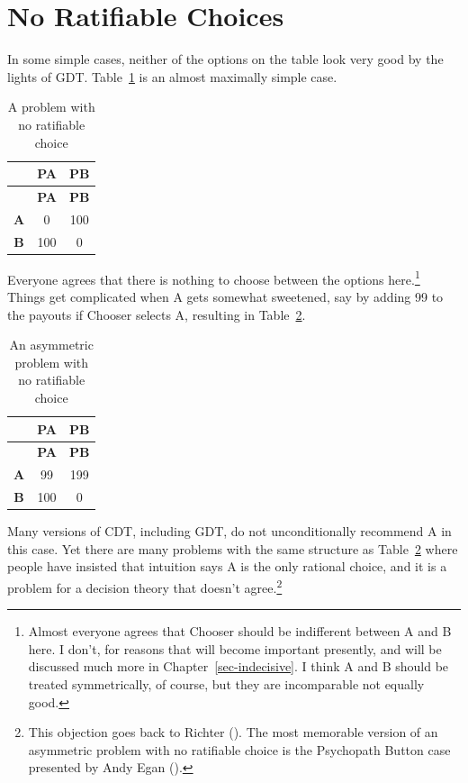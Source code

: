\documentclass[
  12pt,
  letterpaper,
  DIV=11,
  numbers=noendperiod]{scrreprt}
\begin{document}
\section{No Ratifiable Choices}\label{sec-no-ratify}

In some simple cases, neither of the options on the table look very good
by the lights of GDT. Table~\ref{tbl-no-ratify-1} is an almost maximally
simple case.

\begin{longtable}[]{@{}ccc@{}}
\caption{A problem with no ratifiable
choice}\label{tbl-no-ratify-1}\tabularnewline
\toprule\noalign{}
& \textbf{PA} & \textbf{PB} \\
\midrule\noalign{}
\endfirsthead
\toprule\noalign{}
& \textbf{PA} & \textbf{PB} \\
\midrule\noalign{}
\endhead
\bottomrule\noalign{}
\endlastfoot
\textbf{A} & 0 & 100 \\
\textbf{B} & 100 & 0 \\
\end{longtable}

Everyone agrees that there is nothing to choose between the options
here.\footnote{Almost everyone agrees that Chooser should be indifferent
  between A and B here. I don't, for reasons that will become important
  presently, and will be discussed much more in
  Chapter~\ref{sec-indecisive}. I think A and B should be treated
  symmetrically, of course, but they are incomparable not equally good.}
Things get complicated when A gets somewhat sweetened, say by adding 99
to the payouts if Chooser selects A, resulting in
Table~\ref{tbl-no-ratify-2}.

\begin{longtable}[]{@{}ccc@{}}
\caption{An asymmetric problem with no ratifiable
choice}\label{tbl-no-ratify-2}\tabularnewline
\toprule\noalign{}
& \textbf{PA} & \textbf{PB} \\
\midrule\noalign{}
\endfirsthead
\toprule\noalign{}
& \textbf{PA} & \textbf{PB} \\
\midrule\noalign{}
\endhead
\bottomrule\noalign{}
\endlastfoot
\textbf{A} & 99 & 199 \\
\textbf{B} & 100 & 0 \\
\end{longtable}

Many versions of CDT, including GDT, do not unconditionally recommend A
in this case. Yet there are many problems with the same structure as
Table~\ref{tbl-no-ratify-2} where people have insisted that intuition
says A is the only rational choice, and it is a problem for a decision
theory that doesn't agree.\footnote{This objection goes back to Richter
  (). The most memorable version of an
  asymmetric problem with no ratifiable choice is the Psychopath Button
  case presented by Andy Egan ().}
\end{document}
